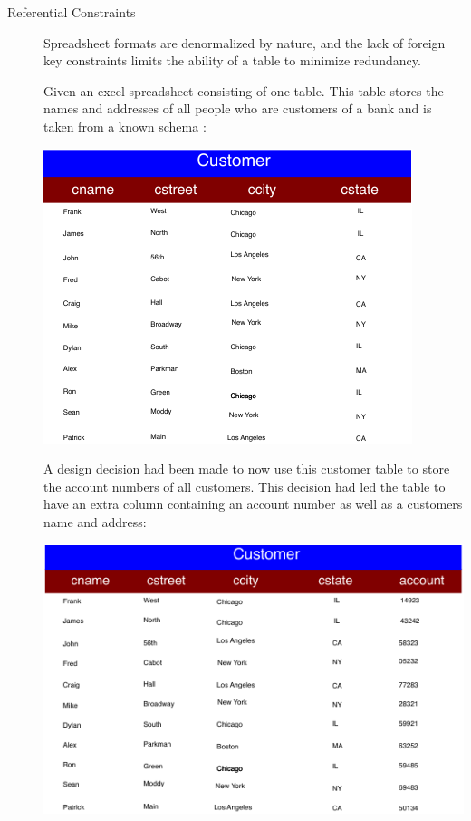 \documentclass{../sty/acm_proc_article-sp}
\begin{document}
\begin{description}

\item[Referential Constraints] Spreadsheet formats are denormalized by nature, and the lack of foreign key constraints limits the ability of a table to minimize redundancy.

Given an excel spreadsheet consisting of one table. This table stores the names and addresses of all people who are customers of a bank and is taken from a known schema \cite{Mitch}:

\includegraphics{../img/initial_table}

A design decision had been made to now use this customer table to store the account numbers of all customers. This decision had led the table to have an extra column containing an account number as well as a customers name and address:

\includegraphics[scale=.9]{../img/second_table} 


\end{description}
\end{document}
